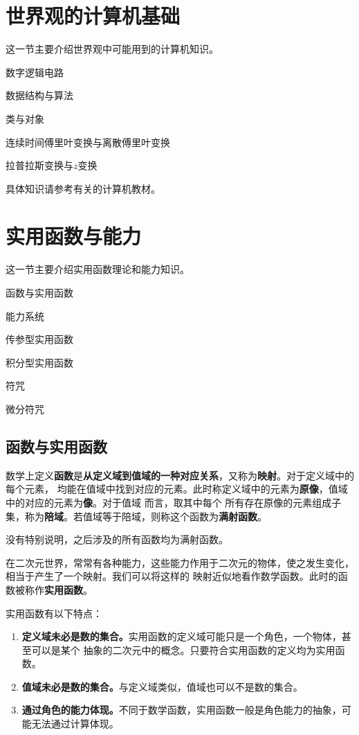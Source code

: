 \documentclass[lang=cn,newtx,10pt,scheme=chinese]{elegantbook}
\begin{document}
\section{世界观的计算机基础}
这一节主要介绍世界观中可能用到的计算机知识。
\begin{introduction}
    \item 数字逻辑电路
    \item 数据结构与算法
    \item 类与对象
    \item 连续时间傅里叶变换与离散傅里叶变换
    \item 拉普拉斯变换与\(z\)变换
\end{introduction}
具体知识请参考有关的计算机教材。

\section{实用函数与能力}
这一节主要介绍实用函数理论和能力知识。
\begin{introduction}
    \item 函数与实用函数
    \item 能力系统
    \item 传参型实用函数
    \item 积分型实用函数
    \item 符咒
    \item 微分符咒
\end{introduction}

\subsection{函数与实用函数}
数学上定义\textbf{函数}是\textbf{从定义域到值域的一种对应关系}，又称为\textbf{映射}。对于定义域中的每个元素，
均能在值域中找到对应的元素。此时称定义域中的元素为\textbf{原像}，值域中的对应的元素为\textbf{像}。对于值域
而言，取其中每个
所有存在原像的元素组成子集，称为\textbf{陪域}。若值域等于陪域，则称这个函数为\textbf{满射函数}。

没有特别说明，之后涉及的所有函数均为满射函数。

在二次元世界，常常有各种能力，这些能力作用于二次元的物体，使之发生变化，相当于产生了一个映射。我们可以将这样的
映射近似地看作数学函数。此时的函数被称作\textbf{实用函数}。

实用函数有以下特点：

\begin{enumerate}
    \item \textbf{定义域未必是数的集合。}实用函数的定义域可能只是一个角色，一个物体，甚至可以是某个
          抽象的二次元中的概念。只要符合实用函数的定义均为实用函数。
    \item \textbf{值域未必是数的集合。}与定义域类似，值域也可以不是数的集合。
    \item \textbf{通过角色的能力体现。}不同于数学函数，实用函数一般是角色能力的抽象，可能无法通过计算体现。
\end{enumerate}
\end{document}
